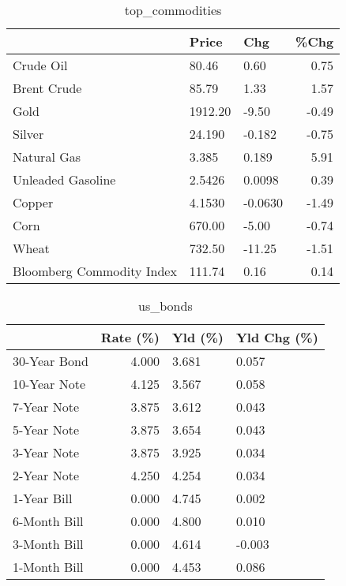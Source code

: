 \documentclass{article}%
\begin{document}
\begin{table}[htbp]%
\caption{top\_commodities}%
\centering%
\begin{adjustbox}{width=1\textwidth}%
\begin{tabular}{lllr}
\toprule
                          &   Price &     Chg &  \%Chg \\
\midrule
               Crude Oil  &   80.46 &    0.60 &  0.75 \\
             Brent Crude  &   85.79 &    1.33 &  1.57 \\
                    Gold  & 1912.20 &   -9.50 & -0.49 \\
                  Silver  &  24.190 &  -0.182 & -0.75 \\
             Natural Gas  &   3.385 &   0.189 &  5.91 \\
       Unleaded Gasoline  &  2.5426 &  0.0098 &  0.39 \\
                  Copper  &  4.1530 & -0.0630 & -1.49 \\
                    Corn  &  670.00 &   -5.00 & -0.74 \\
                   Wheat  &  732.50 &  -11.25 & -1.51 \\
Bloomberg Commodity Index &  111.74 &    0.16 &  0.14 \\
\bottomrule
\end{tabular}
%
\end{adjustbox}%
\end{table}

%


\begin{table}[htbp]%
\caption{us\_bonds}%
\centering%
\begin{adjustbox}{width=1\textwidth}%
\begin{tabular}{lrll}
\toprule
             &  Rate (\%) & Yld (\%) & Yld Chg (\%) \\
\midrule
30-Year Bond &     4.000 &   3.681 &       0.057 \\
10-Year Note &     4.125 &   3.567 &       0.058 \\
 7-Year Note &     3.875 &   3.612 &       0.043 \\
 5-Year Note &     3.875 &   3.654 &       0.043 \\
 3-Year Note &     3.875 &   3.925 &       0.034 \\
 2-Year Note &     4.250 &   4.254 &       0.034 \\
 1-Year Bill &     0.000 &   4.745 &       0.002 \\
6-Month Bill &     0.000 &   4.800 &       0.010 \\
3-Month Bill &     0.000 &   4.614 &      -0.003 \\
1-Month Bill &     0.000 &   4.453 &       0.086 \\
\bottomrule
\end{tabular}
%
\end{adjustbox}%
\end{table}
\end{document}
